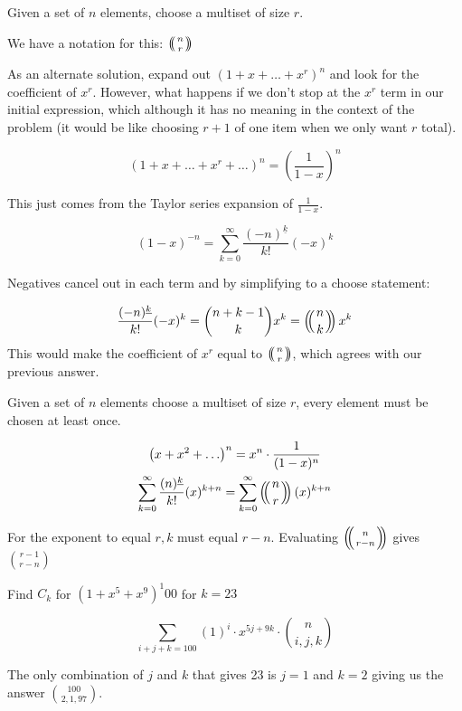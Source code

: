 \begin{problem}{}
    Given a set of $n$ elements, choose a multiset of size $r$.
\end{problem}
\begin{solution}
    We have a notation for this: $\snb n r$
\end{solution}

\begin{solution}
    As an alternate solution, expand out $\left(1+x+\ldots+x^{r}\right)^{n}$ and look for the coefficient of $x^{r}$. However, what happens if we don't stop at the $x^{r}$ term in our initial expression, which although it has no meaning in the context of the problem (it would be like choosing $r+1$ of one item when we only want $r$ total).

    $$
    \left(1+x+\ldots+x^{r}+\ldots\right)^{n}=\left(\frac{1}{1-x}\right)^{n}
    $$
    
    This just comes from the Taylor series expansion of $\frac{1}{1-x}$.
    
    $$
    (1-x)^{-n}=\sum_{k=0}^{\infty} \frac{(-n)^{\underline{k}}}{k !}(-x)^{k}
    $$
    
    Negatives cancel out in each term and by simplifying to a choose statement:
    
    $$
    \frac{(-n)^{\underline{k}}}{k !}(-x)^{k}=\binom{n+k-1}k x^{k}= \snb n k x^{k}
    $$
    This would make the coefficient of $x^{r}$ equal to $\snb n r$, which agrees with our previous answer.
    
    \end{solution}

\begin{problem}{}
    Given a set of $n$ elements choose a multiset of size $r$, every element must be chosen at least once.
\end{problem}

\begin{solution}
    $$
    \begin{gathered}
    \left(x+x^{2}+\ldots\right)^{n}=x^{n} \cdot \frac{1}{(1-x)^{n}} \\
    \sum_{k=0}^{\infty} \frac{(n)^{\underline{k}}}{k !}(x)^{k+n}=\sum_{k=0}^{\infty} \snb n r(x)^{k+n}
    \end{gathered}
    $$
    
    For the exponent to equal $r, k$ must equal $r-n$. Evaluating $\snb n {r-n}$ gives $\binom{r-1}{r-n}$    
\end{solution}

\begin{problem}{}
    Find $C_{k}$ for $\left(1+x^{5}+x^{9}\right)^{1} 00$ for $k=23$
\end{problem}

\begin{solution}

    $$
    \sum_{i+j+k=100}(1)^{i} \cdot x^{5 j+9 k} \cdot\binom n {i,j,k}
    $$
    
    The only combination of $j$ and $k$ that gives 23 is $j=1$ and $k=2$ giving us the answer $\binom{100}{2,1,97}$.    
\end{solution}

